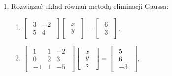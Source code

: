 \documentclass{article}
\begin{document}
\begin{enumerate}
\begin{enumerate}
            \item $\begin{bmatrix}\begin{array}{rrr} 0 & 2 & 3\\ 3 & 0 & 2\\ -2 & 4 & 0 \end{array}\end{bmatrix} \begin{bmatrix}\begin{array}{r} x\\ y\\ z \end{array}\end{bmatrix} = \begin{bmatrix}\begin{array}{r} 2\\ 5\\ 2 \end{array}\end{bmatrix}$.
        \end{enumerate}

    \item Rozwiązać układ równań metodą eliminacji Gaussa:
        \begin{enumerate}
            \item $\begin{bmatrix}\begin{array}{rr} 3 & -2\\ 5 & 4 \end{array}\end{bmatrix} \begin{bmatrix}\begin{array}{r} x\\ y \end{array}\end{bmatrix} = \begin{bmatrix}\begin{array}{r} 6\\ 3 \end{array}\end{bmatrix}$,

            \item $\begin{bmatrix}\begin{array}{rrr} 1 & 1 & -2\\ 0 & 2 & 3\\ -1 & 1 & -5 \end{array}\end{bmatrix} \begin{bmatrix}\begin{array}{r} x\\ y\\ z \end{array}\end{bmatrix} = \begin{bmatrix}\begin{array}{r} 5\\ 6\\ -3 \end{array}\end{bmatrix}$,


\end{enumerate}
\end{enumerate}
\end{document}
